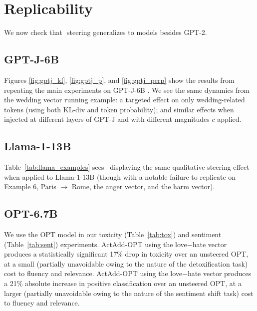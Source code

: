 \section{Replicability}
\label{sec:replic}
We now check that \shortmethod\,\,steering generalizes to models besides GPT-2.

\subsection{GPT-J-6B}

Figures \ref{fig:gptj_kl}, \ref{fig:gptj_p}, and \ref{fig:gptj_perp} show the results from repeating the main experiments on GPT-J-6B \cite{gptj}. We see the same dynamics from the wedding vector running example: a targeted effect on only wedding-related tokens (using both KL-div and token probability); and similar effects when injected at different layers of GPT-J and with different magnitudes $c$ applied.


\subsection{Llama-1-13B}

Table~\ref{tab:llama_examples} sees \shortmethod\, displaying the same qualitative steering effect when applied to Llama-1-13B \cite{touvron2023llama} (though with a notable failure to replicate on Example 6, Paris $\rightarrow$ Rome, the anger vector, and the harm vector).%


\subsection{OPT-6.7B}

We use the OPT model \cite{zhang2022opt} in our toxicity (Table~\ref{tab:tox}) and sentiment (Table~\ref{tab:sent}) experiments. ActAdd-OPT using the love$-$hate vector produces a statistically significant 17\% drop in toxicity over an unsteered OPT, at a small (partially unavoidable owing to the nature of the detoxification task) cost to fluency and relevance. ActAdd-OPT using the love$-$hate vector produces a 21\% absolute increase in positive classification over an unsteered OPT, at a larger (partially unavoidable owing to the nature of the sentiment shift task) cost to fluency and relevance.

